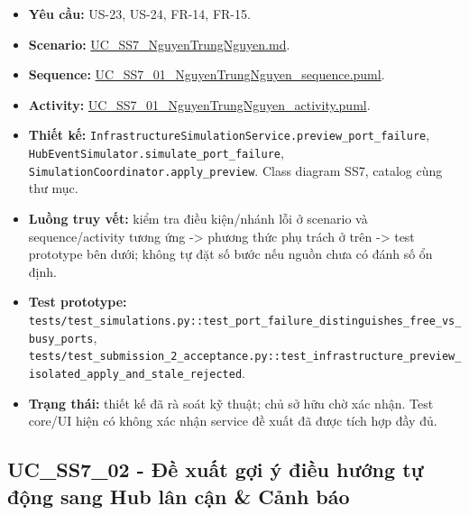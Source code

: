 \documentclass[11pt,a4paper]{article}
\providecommand{\tightlist}{%
  \setlength{\itemsep}{0pt}\setlength{\parskip}{0pt}}
\begin{document}
\begin{itemize}
\tightlist
\item
  \textbf{Yêu cầu:} US-23, US-24, FR-14, FR-15.
\item
  \textbf{Scenario:}
  \href{../../../../docs/diagrams/Use-case\%20detail-scenario/SS7/Usecase\%20scenario/UC_SS7_NguyenTrungNguyen.md}{UC\_SS7\_NguyenTrungNguyen.md}.
\item
  \textbf{Sequence:}
  \href{../../../../docs/diagrams/Use-case\%20detail-scenario/SS7/Sequence\%20diagrams/UC_SS7_01_NguyenTrungNguyen_sequence.puml}{UC\_SS7\_01\_NguyenTrungNguyen\_sequence.puml}.
\item
  \textbf{Activity:}
  \href{../../../../docs/diagrams/Use-case\%20detail-scenario/SS7/Activity\%20diagrams/UC_SS7_01_NguyenTrungNguyen_activity.puml}{UC\_SS7\_01\_NguyenTrungNguyen\_activity.puml}.
\item
  \textbf{Thiết kế:}
  \texttt{InfrastructureSimulationService.preview\_port\_failure},
  \texttt{HubEventSimulator.simulate\_port\_failure},
  \texttt{SimulationCoordinator.apply\_preview}. Class diagram SS7,
  catalog cùng thư mục.
\item
  \textbf{Luồng truy vết:} kiểm tra điều kiện/nhánh lỗi ở scenario và
  sequence/activity tương ứng -\textgreater{} phương thức phụ trách ở
  trên -\textgreater{} test prototype bên dưới; không tự đặt số bước nếu
  nguồn chưa có đánh số ổn định.
\item
  \textbf{Test prototype:}
  \texttt{tests/test\_simulations.py::test\_port\_failure\_distinguishes\_free\_vs\_busy\_ports},
  \texttt{tests/test\_submission\_2\_acceptance.py::test\_infrastructure\_preview\_isolated\_apply\_and\_stale\_rejected}.
\item
  \textbf{Trạng thái:} thiết kế đã rà soát kỹ thuật; chủ sở hữu chờ xác
  nhận. Test core/UI hiện có không xác nhận service đề xuất đã được tích
  hợp đầy đủ.
\end{itemize}

\hypertarget{uc_ss7_02---ux111ux1ec1-xuux1ea5t-gux1ee3i-uxfd-ux111iux1ec1u-hux1b0ux1edbng-tux1ef1-ux111ux1ed9ng-sang-hub-luxe2n-cux1eadn-cux1ea3nh-buxe1o}{%
\subsection{UC\_SS7\_02 - Đề xuất gợi ý điều hướng tự động sang Hub lân
cận \& Cảnh
báo}\label{uc_ss7_02---ux111ux1ec1-xuux1ea5t-gux1ee3i-uxfd-ux111iux1ec1u-hux1b0ux1edbng-tux1ef1-ux111ux1ed9ng-sang-hub-luxe2n-cux1eadn-cux1ea3nh-buxe1o}}
\end{document}
